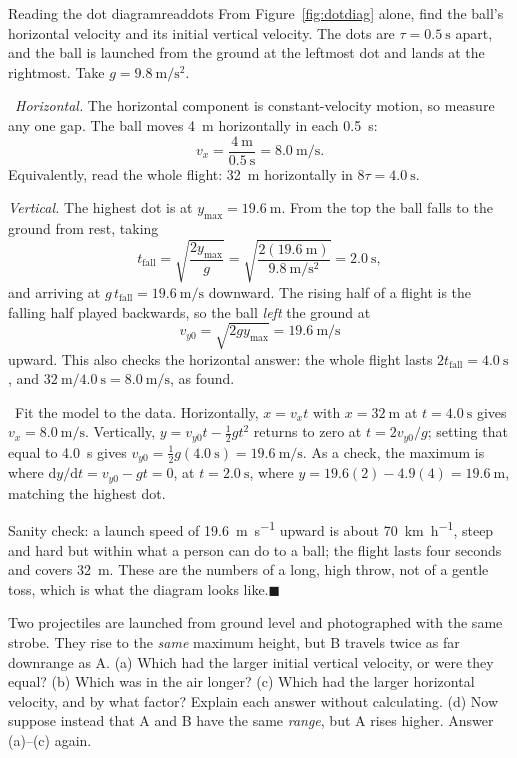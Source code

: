 \documentclass[11pt,twoside,openany]{book}
\newcommand{\dd}{\mathrm{d}}
\newcounter{check}[chapter]
\newcommand{\viewtag}[3]{\fcolorbox{#2}{#3}{\footnotesize\textbf{\textcolor{#2}{#1}}}}
\newcommand{\elemtag}{\viewtag{Elementary}{elemcol}{elempale}}
\newcommand{\calctag}{\viewtag{Calculus}{calccol}{calcpale}}
\newcommand{\elem}{\par\medskip\noindent\elemtag\ }
\newcommand{\calc}{\par\medskip\noindent\calctag\ }
\newcommand{\qed}{\hfill$\blacksquare$}
\begin{document}
\begin{example}{Reading the dot diagram}{readdots}
From Figure~\ref{fig:dotdiag} alone, find the ball's horizontal velocity and its initial vertical velocity. The dots are $\tau = \SI{0.5}{\second}$ apart, and the ball is launched from the ground at the leftmost dot and lands at the rightmost. Take $g = \SI{9.8}{\metre\per\second\squared}$.

\elem \emph{Horizontal.} The horizontal component is constant-velocity motion, so measure any one gap. The ball moves \SI{4}{\metre} horizontally in each \SI{0.5}{\second}:
\[
v_x = \frac{\SI{4}{\metre}}{\SI{0.5}{\second}} = \SI{8.0}{\metre\per\second}.
\]
Equivalently, read the whole flight: \SI{32}{\metre} horizontally in $8\tau = \SI{4.0}{\second}$.

\emph{Vertical.} The highest dot is at $y_{\max} = \SI{19.6}{\metre}$. From the top the ball falls to the ground from rest, taking
\[
t_{\text{fall}} = \sqrt{\frac{2 y_{\max}}{g}} = \sqrt{\frac{2(\SI{19.6}{\metre})}{\SI{9.8}{\metre\per\second\squared}}} = \SI{2.0}{\second},
\]
and arriving at $g\,t_{\text{fall}} = \SI{19.6}{\metre\per\second}$ downward. The rising half of a flight is the falling half played backwards, so the ball \emph{left} the ground at
\[
v_{y0} = \sqrt{2 g y_{\max}} = \SI{19.6}{\metre\per\second}
\]
upward. This also checks the horizontal answer: the whole flight lasts $2t_{\text{fall}} = \SI{4.0}{\second}$, and $\SI{32}{\metre}/\SI{4.0}{\second} = \SI{8.0}{\metre\per\second}$, as found.

\calc Fit the model to the data. Horizontally, $x = v_x t$ with $x = \SI{32}{\metre}$ at $t = \SI{4.0}{\second}$ gives $v_x = \SI{8.0}{\metre\per\second}$. Vertically, $y = v_{y0}t - \tfrac12 g t^2$ returns to zero at $t = 2v_{y0}/g$; setting that equal to \SI{4.0}{\second} gives $v_{y0} = \tfrac12 g(\SI{4.0}{\second}) = \SI{19.6}{\metre\per\second}$. As a check, the maximum is where $\dd y/\dd t = v_{y0} - gt = 0$, at $t = \SI{2.0}{\second}$, where $y = 19.6(2) - 4.9(4) = \SI{19.6}{\metre}$, matching the highest dot.

Sanity check: a launch speed of \SI{19.6}{\metre\per\second} upward is about \SI{70}{\kilo\metre\per\hour}, steep and hard but within what a person can do to a ball; the flight lasts four seconds and covers \SI{32}{\metre}. These are the numbers of a long, high throw, not of a gentle toss, which is what the diagram looks like.\qed
\end{example}

\begin{checkbox}
Two projectiles are launched from ground level and photographed with the same strobe. They rise to the \emph{same} maximum height, but B travels twice as far downrange as A. (a) Which had the larger initial vertical velocity, or were they equal? (b) Which was in the air longer? (c) Which had the larger horizontal velocity, and by what factor? Explain each answer without calculating. (d) Now suppose instead that A and B have the same \emph{range}, but A rises higher. Answer (a)--(c) again.
\end{checkbox}
\end{document}

